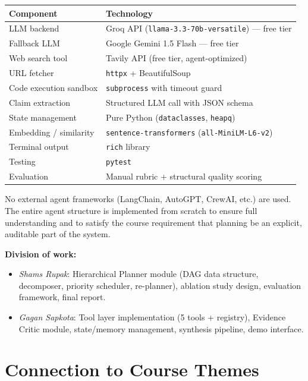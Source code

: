 \documentclass[11pt]{article}
\begin{document}
\begin{center}
\begin{tabular}{@{}ll@{}}
\toprule
\textbf{Component} & \textbf{Technology} \\
\midrule
LLM backend & Groq API (\texttt{llama-3.3-70b-versatile}) --- free tier \\
Fallback LLM & Google Gemini 1.5 Flash --- free tier \\
Web search tool & Tavily API (free tier, agent-optimized) \\
URL fetcher & \texttt{httpx} + BeautifulSoup \\
Code execution sandbox & \texttt{subprocess} with timeout guard \\
Claim extraction & Structured LLM call with JSON schema \\
State management & Pure Python (\texttt{dataclasses}, \texttt{heapq}) \\
Embedding / similarity & \texttt{sentence-transformers} (\texttt{all-MiniLM-L6-v2}) \\
Terminal output & \texttt{rich} library \\
Testing & \texttt{pytest} \\
Evaluation & Manual rubric + structural quality scoring \\
\bottomrule
\end{tabular}
\end{center}

No external agent frameworks (LangChain, AutoGPT, CrewAI, etc.) are used. The entire agent structure is implemented from scratch to ensure full understanding and to satisfy the course requirement that planning be an explicit, auditable part of the system.

\textbf{Division of work:}
\begin{itemize}[leftmargin=1.5em, itemsep=2pt]
  \item \textit{Shams Rupak}: Hierarchical Planner module (DAG data structure, decomposer, priority scheduler, re-planner), ablation study design, evaluation framework, final report.
  \item \textit{Gagan Sapkota}: Tool layer implementation (5 tools + registry), Evidence Critic module,
        state/memory management, synthesis pipeline, demo interface.
\end{itemize}

\section{Connection to Course Themes}
\end{document}
